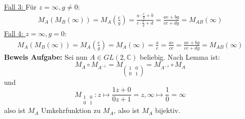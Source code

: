 \begin{problem*}[3]
\begin{align*}
\end{align*}
\underline{Fall 3: } Für $ z = \infty, g \neq 0$: 
\begin{align*}
M_A(M_B(\infty)) = M_A\left(\frac{e}{g}\right) = \frac{a \cdot \frac{e}{g} + b}{c \cdot \frac{e}{g} + d}
 = \frac{ae + bg}{ce+dg} = M_{ AB }(\infty)  
\end{align*}
\underline{Fall 4: } $ z = \infty, g = 0:$
\begin{align*}
M_A(M_B(\infty)) = M_A\left(\frac{e}{g}\right) = M_A(\infty) = \frac{a}{c} = \frac{ae}{ce} = \frac{ae + bg}{ce + dg} = M_{ AB }(\infty) 
\end{align*}
\textbf{Beweis Aufgabe:} Sei nun $A \in GL(2,\mathbb{C})$ beliebig. Nach Lemma ist:
\begin{equation*}
  M_A \circ M_{ A^{ -1 } } = M_{ \left(\begin{smallmatrix}
  1 & 0 \\
  0 & 1 
  \end{smallmatrix}\right) } = M_{ A^{-1 } } \circ M_A
\end{equation*}
und 
\begin{equation*}
  M_{ \begin{smallmatrix}
  1 & 0 \\
  0 & 1 
  \end{smallmatrix} } : z \mapsto \frac{1z+0}{0z+1} = z, \infty \mapsto \frac{1}{0} = \infty 
\end{equation*}
also ist $M_A$ Umkehrfunktion zu $M_A$, also ist $M_A$ bijektiv.\\

\end{problem*}
